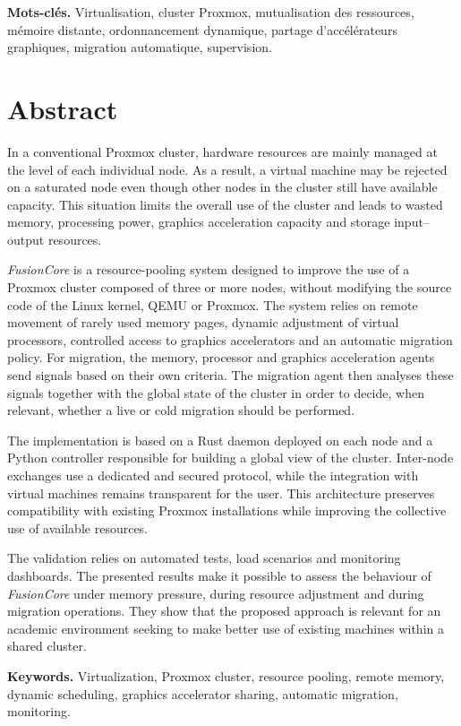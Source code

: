 \documentclass[
    language=french,
    school=estg,
    docstage=final,
    media=paper,
    bookprint=false,
    linkcolor=red!45!black,
    chapterstyle=classic,
    coverstyle=classic,
    aiacknowledgement=false,
    listprefix=false
]{IPLeiriaThesis}
\theoremstyle{definition}
\theoremstyle{plain}
\begin{document}
\textbf{Mots-clés.} Virtualisation, cluster Proxmox, mutualisation des ressources, mémoire distante, ordonnancement dynamique, partage d'accélérateurs graphiques, migration automatique, supervision.

\chapter*{Abstract}

In a conventional Proxmox cluster, hardware resources are mainly managed at the level of each individual node. As a result, a virtual machine may be rejected on a saturated node even though other nodes in the cluster still have available capacity. This situation limits the overall use of the cluster and leads to wasted memory, processing power, graphics acceleration capacity and storage input--output resources.

\emph{FusionCore} is a resource-pooling system designed to improve the use of a Proxmox cluster composed of three or more nodes, without modifying the source code of the Linux kernel, QEMU or Proxmox. The system relies on remote movement of rarely used memory pages, dynamic adjustment of virtual processors, controlled access to graphics accelerators and an automatic migration policy. For migration, the memory, processor and graphics acceleration agents send signals based on their own criteria. The migration agent then analyses these signals together with the global state of the cluster in order to decide, when relevant, whether a live or cold migration should be performed.

The implementation is based on a Rust daemon deployed on each node and a Python controller responsible for building a global view of the cluster. Inter-node exchanges use a dedicated and secured protocol, while the integration with virtual machines remains transparent for the user. This architecture preserves compatibility with existing Proxmox installations while improving the collective use of available resources.

The validation relies on automated tests, load scenarios and monitoring dashboards. The presented results make it possible to assess the behaviour of \emph{FusionCore} under memory pressure, during resource adjustment and during migration operations. They show that the proposed approach is relevant for an academic environment seeking to make better use of existing machines within a shared cluster.

\textbf{Keywords.} Virtualization, Proxmox cluster, resource pooling, remote memory, dynamic scheduling, graphics accelerator sharing, automatic migration, monitoring.
\end{document}
